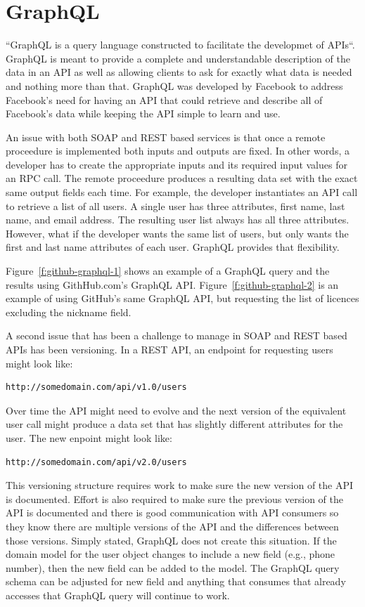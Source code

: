 \section{GraphQL}
``GraphQL is a query language constructed to facilitate the developmet of APIs``\cite{FacebookGraphQL2018}.
GraphQL is meant to provide a complete and understandable description of the
data in an API as well as allowing clients to ask for exactly what data is 
needed and nothing more than that\cite{FacebookGraphQL2018}.  GraphQL was 
developed by Facebook to address Facebook's need for having an API that could 
retrieve and describe all of Facebook's data while keeping the API simple to 
learn and use\cite{Byron2015}.

An issue with both SOAP and REST based services is that once a remote
proceedure is implemented both inputs and outputs are fixed.  In other words,
a developer has to create the appropriate inputs and its required input values
for an RPC call.  The remote proceedure produces a resulting data set with the
exact same output fields each time.  For example, the developer instantiates an
API call to retrieve a list of all users.  A single user has three attributes,
first name, last name, and email address.  The resulting user list always has
all three attributes.  However, what if the developer wants the same list of
users, but only wants the first and last name attributes of each user.  GraphQL
provides that flexibility.

Figure~\ref{f:github-graphql-1} shows an example of a GraphQL query and the
results using GithHub.com's GraphQL API.  Figure~\ref{f:github-graphql-2} is an
example of using GitHub's same GraphQL API, but requesting the list of licences
excluding the nickname field.

A second issue that has been a challenge to manage in SOAP and REST based APIs
has been versioning.  In a REST API, an endpoint for requesting users might look
like:
\begin{verbatim}http://somedomain.com/api/v1.0/users \end{verbatim}
Over time the API might need to evolve and the next version of the equivalent
user call might produce a data set that has slightly different attributes for
the user. The new enpoint might look like:
\begin{verbatim}http://somedomain.com/api/v2.0/users \end{verbatim}
This versioning structure requires work to make sure the new version of the API
is documented.  Effort is also required to make sure the previous version of the
API is documented and there is good communication with API consumers so they
know there are multiple versions of the API and the differences between those
versions.  Simply stated, GraphQL does not create this situation.  If the domain
model for the user object changes to include a new field (e.g., phone number),
then the new field can be added to the model.  The GraphQL query schema can be
adjusted for new field and anything that consumes that already accesses that 
GraphQL query will continue to work.

